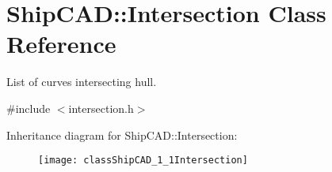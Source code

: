 \hypertarget{classShipCAD_1_1Intersection}{}\section{Ship\+C\+AD\+:\+:Intersection Class Reference}
\label{classShipCAD_1_1Intersection}


List of curves intersecting hull.  




{\ttfamily \#include $<$intersection.\+h$>$}

Inheritance diagram for Ship\+C\+AD\+:\+:Intersection\+:\begin{figure}[H]
\begin{center}
\leavevmode
\texttt{[image: classShipCAD\_1\_1Intersection]}
\end{center}
\end{figure}
